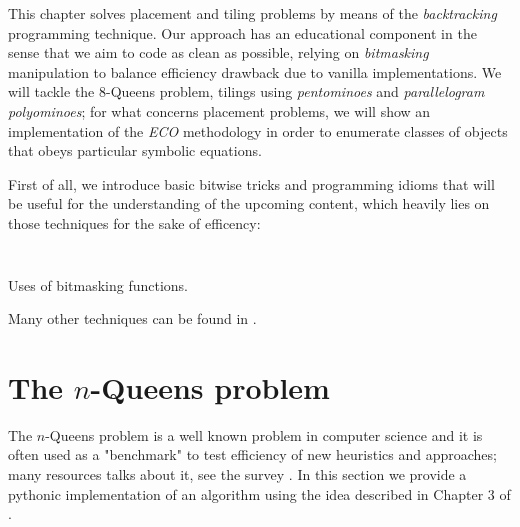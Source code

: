 
This chapter solves placement and tiling problems by means of the
\textit{backtracking} programming technique. Our approach has an educational
component in the sense that we aim to code as clean as possible, relying on
\textit{bitmasking} manipulation to balance efficiency drawback due to vanilla
implementations. We will tackle the $8$-Queens problem, tilings using
\textit{pentominoes} and \textit{parallelogram polyominoes}; for what concerns
placement problems, we will show an implementation of the \textit{ECO}
methodology in order to enumerate classes of objects that obeys particular
symbolic equations.

First of all, we introduce basic bitwise tricks and programming idioms that
will be useful for the understanding of the upcoming content, which heavily lies
on those techniques for the sake of efficency:
\inputminted[baselinestretch=0.8,stripnl=false]{python}{backtracking/bits_clean.py}
\begin{margintable}[-3cm]
\inputminted[baselinestretch=0.8,stripnl=false]{python}{backtracking/bits_clean_test.py}
\caption{Uses of bitmasking functions.}
\end{margintable}
Many other techniques can be found in \citep{Warren:2012:HD:2462741}.


\section{The $n$-Queens problem}

The $n$-Queens problem is a well known problem in computer science and it is
often used as a "benchmark" to test efficiency of new heuristics and
approaches; many resources talks about it, see the survey \citep{BELL20091}.
In this section we provide a pythonic implementation of an algorithm using the
idea described in Chapter $3$ of \citep{RuskeyCombGen}.

